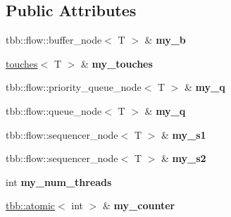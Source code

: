 \subsection*{Public Attributes}
\begin{DoxyCompactItemize}
\item 
\hypertarget{structparallel__put__get_a7907d0ef4609245499404ec62dab102a}{}tbb\+::flow\+::buffer\+\_\+node$<$ T $>$ \& {\bfseries my\+\_\+b}\label{structparallel__put__get_a7907d0ef4609245499404ec62dab102a}

\item 
\hypertarget{structparallel__put__get_a8dff44df7a27db12695994db29c3d068}{}\hyperlink{structtouches}{touches}$<$ T $>$ \& {\bfseries my\+\_\+touches}\label{structparallel__put__get_a8dff44df7a27db12695994db29c3d068}

\item 
\hypertarget{structparallel__put__get_ac398baaa333adb01237c0ad8c8b6e98f}{}tbb\+::flow\+::priority\+\_\+queue\+\_\+node$<$ T $>$ \& {\bfseries my\+\_\+q}\label{structparallel__put__get_ac398baaa333adb01237c0ad8c8b6e98f}

\item 
\hypertarget{structparallel__put__get_a201788250a094c068ddc40aa03b9a14f}{}tbb\+::flow\+::queue\+\_\+node$<$ T $>$ \& {\bfseries my\+\_\+q}\label{structparallel__put__get_a201788250a094c068ddc40aa03b9a14f}

\item 
\hypertarget{structparallel__put__get_a51a3a50677ac4234a482b2c4ab38a8a8}{}tbb\+::flow\+::sequencer\+\_\+node$<$ T $>$ \& {\bfseries my\+\_\+s1}\label{structparallel__put__get_a51a3a50677ac4234a482b2c4ab38a8a8}

\item 
\hypertarget{structparallel__put__get_a6d0c8ce2f1e4615cb33f299d36c074a0}{}tbb\+::flow\+::sequencer\+\_\+node$<$ T $>$ \& {\bfseries my\+\_\+s2}\label{structparallel__put__get_a6d0c8ce2f1e4615cb33f299d36c074a0}

\item 
\hypertarget{structparallel__put__get_a03603d683d7a278f9ce03399ec52261c}{}int {\bfseries my\+\_\+num\+\_\+threads}\label{structparallel__put__get_a03603d683d7a278f9ce03399ec52261c}

\item 
\hypertarget{structparallel__put__get_a2003f786b9ce23c837f5a23a76fd620e}{}\hyperlink{structtbb_1_1atomic}{tbb\+::atomic}$<$ int $>$ \& {\bfseries my\+\_\+counter}\label{structparallel__put__get_a2003f786b9ce23c837f5a23a76fd620e}

\end{DoxyCompactItemize}


